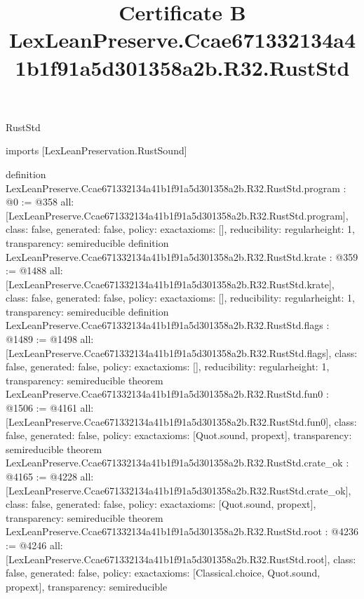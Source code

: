 \begin{lexlean}{RustStd}
\title{Certificate B LexLeanPreserve.Ccae671332134a41b1f91a5d301358a2b.R32.RustStd}
\begin{coremodule}
imports [LexLeanPreservation.RustSound]

definition LexLeanPreserve.Ccae671332134a41b1f91a5d301358a2b.R32.RustStd.program : @0 := @358 {
  all: [LexLeanPreserve.Ccae671332134a41b1f91a5d301358a2b.R32.RustStd.program],
  class: false,
  generated: false,
  policy: exact{axioms: []},
  reducibility: regular{height: 1},
  transparency: semireducible
}
definition LexLeanPreserve.Ccae671332134a41b1f91a5d301358a2b.R32.RustStd.krate : @359 := @1488 {
  all: [LexLeanPreserve.Ccae671332134a41b1f91a5d301358a2b.R32.RustStd.krate],
  class: false,
  generated: false,
  policy: exact{axioms: []},
  reducibility: regular{height: 1},
  transparency: semireducible
}
definition LexLeanPreserve.Ccae671332134a41b1f91a5d301358a2b.R32.RustStd.flags : @1489 := @1498 {
  all: [LexLeanPreserve.Ccae671332134a41b1f91a5d301358a2b.R32.RustStd.flags],
  class: false,
  generated: false,
  policy: exact{axioms: []},
  reducibility: regular{height: 1},
  transparency: semireducible
}
theorem LexLeanPreserve.Ccae671332134a41b1f91a5d301358a2b.R32.RustStd.fun0 : @1506 := @4161 {
  all: [LexLeanPreserve.Ccae671332134a41b1f91a5d301358a2b.R32.RustStd.fun0],
  class: false,
  generated: false,
  policy: exact{axioms: [Quot.sound, propext]},
  transparency: semireducible
}
theorem LexLeanPreserve.Ccae671332134a41b1f91a5d301358a2b.R32.RustStd.crate_ok : @4165 := @4228 {
  all: [LexLeanPreserve.Ccae671332134a41b1f91a5d301358a2b.R32.RustStd.crate_ok],
  class: false,
  generated: false,
  policy: exact{axioms: [Quot.sound, propext]},
  transparency: semireducible
}
theorem LexLeanPreserve.Ccae671332134a41b1f91a5d301358a2b.R32.RustStd.root : @4236 := @4246 {
  all: [LexLeanPreserve.Ccae671332134a41b1f91a5d301358a2b.R32.RustStd.root],
  class: false,
  generated: false,
  policy: exact{axioms: [Classical.choice, Quot.sound, propext]},
  transparency: semireducible
}


\end{coremodule}
\end{lexlean}

